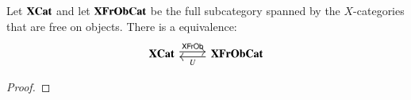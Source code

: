 \documentclass[12pt,oneside,article,draft]{memoir}
\begin{document}
\begin{proposition}\label{prop:free objects}
	Let $\mathbf{XCat}$ and let $\mathbf{XFrObCat}$ be the full subcategory spanned by the $X$-categories that are free on objects. 
	There is a equivalence:
	$$
	\begin{tikzcd}
		\XCat\arrow[r, shift left=.5ex, "\Fun{XFrOb}"]&\Cat{XFrObCat}\arrow[l, shift left=.5ex,"U"]
	\end{tikzcd}
	$$
\end{proposition}
\begin{proof}
%
%
%
%
\end{proof}
\end{document}
